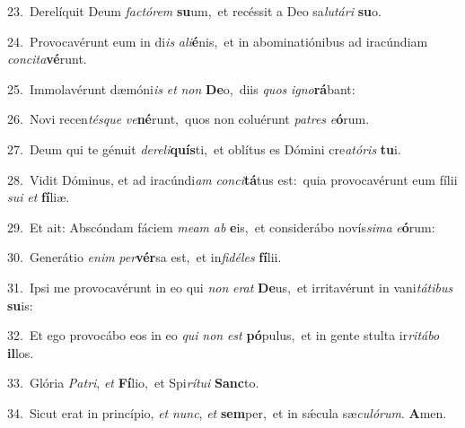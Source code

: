 {\numbfont\textcolor{\numbcolor}{23.}}~Derelíquit Deum \textit{fac}\-\textit{tó}\textit{rem} \textbf{su}\-um,~\star et recéssit a Deo sa\-\textit{lu}\-\textit{tá}\textit{ri} \textbf{su}\-o.\par
{\numbfont\textcolor{\numbcolor}{24.}}~Provocavérunt eum in di\textit{is} \textit{a}\-\textit{li}\textbf{é}nis,~\star et in abominatiónibus ad iracúndiam \textit{con}\-\textit{ci}\textit{ta}\textbf{vé}runt.\par
{\numbfont\textcolor{\numbcolor}{25.}}~Immolavérunt dæmóni\textit{is} \textit{et} \textit{non} \textbf{De}\-o,~\star diis \textit{quos} \textit{i}\-\textit{gno}\textbf{rá}bant:\par
{\numbfont\textcolor{\numbcolor}{26.}}~Novi recen\-\textit{tés}\-\textit{que} \textit{ve}\-\textbf{né}runt,~\star quos non coluérunt \textit{pa}\-\textit{tres} \textit{e}\-\textbf{ó}rum.\par
{\numbfont\textcolor{\numbcolor}{27.}}~Deum qui te génuit \textit{de}\-\textit{re}\textit{li}\textbf{quís}ti,~\star et oblítus es Dómini cre\-\textit{a}\-\textit{tó}\textit{ris} \textbf{tu}\-i.\par
{\numbfont\textcolor{\numbcolor}{28.}}~Vidit Dóminus, et ad iracúndi\textit{am} \textit{con}\-\textit{ci}\textbf{tá}tus est:~\star quia provocavérunt eum fílii \textit{su}\-\textit{i} \textit{et} \textbf{fí}\-liæ.\par
{\numbfont\textcolor{\numbcolor}{29.}}~Et ait: Abscóndam fáciem \textit{me}\-\textit{am} \textit{ab} \textbf{e}\-is,~\star et considerábo novís\-\textit{si}\-\textit{ma} \textit{e}\-\textbf{ó}rum:\par
{\numbfont\textcolor{\numbcolor}{30.}}~Generátio \textit{e}\-\textit{nim} \textit{per}\-\textbf{vér}sa est,~\star et in\-\textit{fi}\-\textit{dé}\textit{les} \textbf{fí}\-lii.\par
{\numbfont\textcolor{\numbcolor}{31.}}~Ipsi me provocavérunt in eo qui \textit{non} \textit{e}\-\textit{rat} \textbf{De}\-us,~\star et irritavérunt in vani\-\textit{tá}\-\textit{ti}\textit{bus} \textbf{su}\-is:\par
{\numbfont\textcolor{\numbcolor}{32.}}~Et ego provocábo eos in eo \textit{qui} \textit{non} \textit{est} \textbf{pó}\-pulus,~\star et in gente stulta ir\-\textit{ri}\-\textit{tá}\textit{bo} \textbf{il}\-los.\par
{\numbfont\textcolor{\numbcolor}{33.}}~Glória \textit{Pa}\-\textit{tri}, \textit{et} \textbf{Fí}\-lio,~\star et Spi\-\textit{rí}\-\textit{tu}\textit{i} \textbf{Sanc}\-to.\par
{\numbfont\textcolor{\numbcolor}{34.}}~Sicut erat in princípio, \textit{et} \textit{nunc}\-, \textit{et} \textbf{sem}\-per,~\star et in sǽcula sæ\-\textit{cu}\-\textit{ló}\textit{rum}. \textbf{A}\-men.\par
